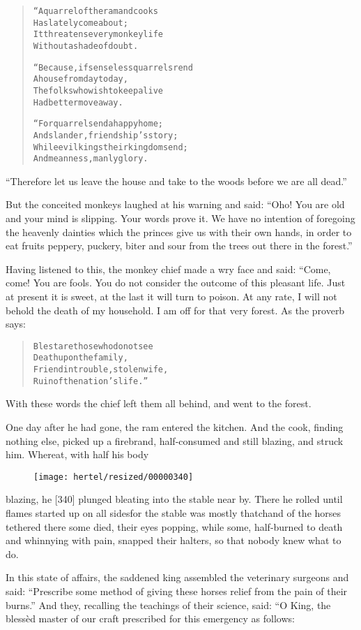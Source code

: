 \documentclass[article, twoside, 10pt]{memoir}
\renewenvironment{verbatim}{%
\begin{quote}%
\vskip -10pt%
\begin{alltt}\normalfont\small}{\end{alltt}%
\end{quote}%
\vskip -10pt
} %
\begin{document}
\begin{verbatim}
“A quarrel of the ram and cooks
    Has lately come about;
It threatens every monkey life
    Without a shade of doubt.

“Because, if senseless quarrels rend
    A house from day to day,
The folks who wish to keep alive
    Had better move away.

“For quarrels end a happy home;
    And slander, friendship's story;
While evil kings their kingdoms end;
    And meanness, manly glory.
\end{verbatim}
``Therefore let us leave the house and take to the woods before we are all dead.''

But the conceited monkeys laughed at his warning and said:
``Oho! You are old and your mind is slipping. Your words prove it. We have no intention of foregoing the heavenly dainties which the princes give us with their own hands, in order to eat fruits peppery, puckery, biter and sour from the trees out there in the forest.''

Having listened to this, the monkey chief made a wry face and said:
“Come, come! You are fools. You do not consider the outcome of this
pleasant life. Just at present it is sweet, at the last it will
turn to poison. At any rate, I will not behold the death of my
household. I am off for that very forest. As the proverb says:

\begin{verbatim}
Blest are those who do not see
Death upon the family,
Friend in trouble, stolen wife,
Ruin of the nation's life.”
\end{verbatim}
With these words the chief left them all behind, and went to the
forest.

One day after he had gone, the ram entered the kitchen. And the
cook, finding nothing else, picked up a firebrand, half-consumed
and still blazing, and struck him. Whereat, with half his body
\begin{figure}[p]\texttt{[image: hertel/resized/00000340]}\end{figure}blazing, he [340] plunged bleating into the stable near by. There
he rolled until flames started up on all sides{\textemdash}for the stable was
mostly thatch{\textemdash}and of the horses tethered there some died, their
eyes popping, while some, half-burned to death and whinnying with
pain, snapped their halters, so that nobody knew what to do.

In this state of affairs, the saddened king assembled the
veterinary surgeons and said:
``Prescribe some method of giving these horses relief from the pain of their burns.''
And they, recalling the teachings of their science, said: “O King,
the blessèd master of our craft prescribed for this emergency as
follows:
\end{document}
